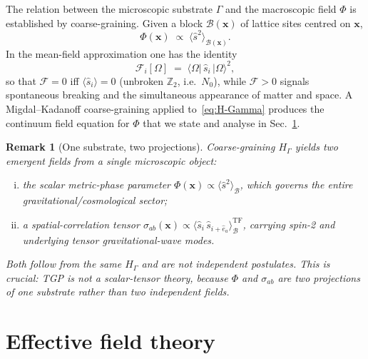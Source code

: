 \documentclass[11pt,a4paper]{article}
\renewcommand{\Phi}{\varPhi}
\newcommand{\Nzero}{N_{0}}
\newcommand{\Ffield}{\mathcal{F}}
\newcommand{\Zp}{\mathbb{Z}_{2}}
\newtheorem{remark}[axiom]{Remark}
\begin{document}
The relation between the microscopic substrate $\Gamma$ and the macroscopic
field $\Phi$ is established by coarse-graining. Given a block
$\mathcal{B}(\mathbf{x})$ of lattice sites centred on $\mathbf{x}$,
\begin{equation}\label{eq:Phi-def}
  \Phi(\mathbf{x})
  \;\propto\;
  \langle\hat{s}^{2}\rangle_{\mathcal{B}(\mathbf{x})}.
\end{equation}
In the mean-field approximation one has the identity
\begin{equation}\label{eq:F-s-relation}
  \Ffield_{i}[\Omega]
  \;=\;\langle\Omega|\,\hat{s}_{i}\,|\Omega\rangle^{2},
\end{equation}
so that $\Ffield=0$ iff $\langle\hat{s}_{i}\rangle=0$ (unbroken $\Zp$,
i.e.\ $\Nzero$), while $\Ffield>0$ signals spontaneous breaking and the
simultaneous appearance of matter and space. A Migdal--Kadanoff
coarse-graining applied to~\eqref{eq:H-Gamma} produces the continuum field
equation for $\Phi$ that we state and analyse in Sec.~\ref{sec:field}.

\begin{remark}[One substrate, two projections]
Coarse-graining $H_{\Gamma}$ yields \emph{two} emergent fields from a
single microscopic object:
\begin{enumerate}[(i),nosep]
  \item the scalar metric-phase parameter
    $\Phi(\mathbf{x})\propto\langle\hat{s}^{2}\rangle_{\mathcal{B}}$,
    which governs the entire gravitational/cosmological sector;
  \item a spatial-correlation tensor
    $\sigma_{ab}(\mathbf{x})\propto
    \langle\hat{s}_{i}\,\hat{s}_{i+\hat{e}_{a}}\rangle_{\mathcal{B}}^{\mathrm{TF}}$,
    carrying spin-2 and underlying tensor gravitational-wave modes.
\end{enumerate}
Both follow from the \emph{same} $H_{\Gamma}$ and are not independent
postulates. This is crucial: TGP is not a scalar-tensor theory, because
$\Phi$ and $\sigma_{ab}$ are two projections of one substrate rather than
two independent fields.
\end{remark}

\section{Effective field theory}\label{sec:field}
\end{document}
